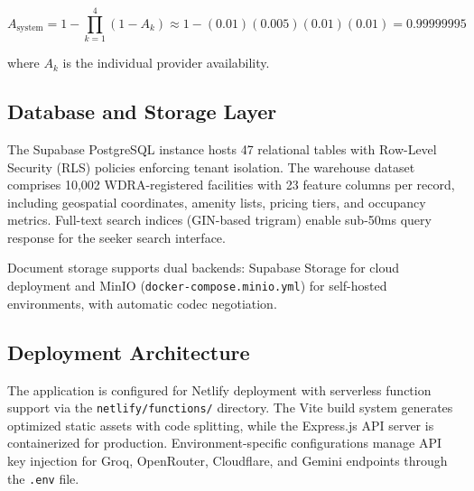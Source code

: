 \[
A_{\text{system}} = 1 - \prod_{k=1}^{4}(1 - A_k) \approx 1 - (0.01)(0.005)(0.01)(0.01) = 0.99999995
\]

\noindent where $A_k$ is the individual provider availability.

\subsection{Database and Storage Layer}

The Supabase PostgreSQL instance hosts 47 relational tables with Row-Level Security (RLS) policies enforcing tenant isolation. The warehouse dataset comprises 10,002 WDRA-registered facilities with 23 feature columns per record, including geospatial coordinates, amenity lists, pricing tiers, and occupancy metrics. Full-text search indices (GIN-based trigram) enable sub-50ms query response for the seeker search interface.

Document storage supports dual backends: Supabase Storage for cloud deployment and MinIO (\texttt{docker-compose.minio.yml}) for self-hosted environments, with automatic codec negotiation.

\subsection{Deployment Architecture}

The application is configured for Netlify deployment with serverless function support via the \texttt{netlify/functions/} directory. The Vite build system generates optimized static assets with code splitting, while the Express.js API server is containerized for production. Environment-specific configurations manage API key injection for Groq, OpenRouter, Cloudflare, and Gemini endpoints through the \texttt{.env} file.

